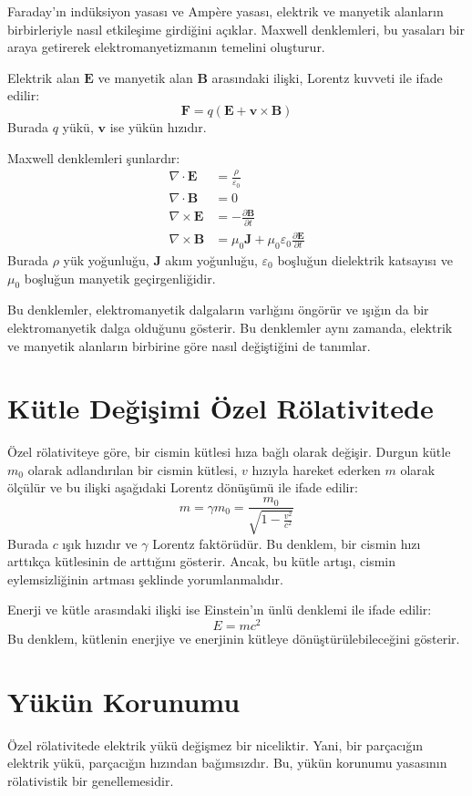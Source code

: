 \documentclass[11pt,letterpaper,twocolumn]{fenbil}
\begin{document}
Faraday'ın indüksiyon yasası ve Ampère yasası, elektrik ve manyetik alanların birbirleriyle nasıl etkileşime girdiğini açıklar. Maxwell denklemleri, bu yasaları bir araya getirerek elektromanyetizmanın temelini oluşturur.

Elektrik alan \( \mathbf{E} \) ve manyetik alan \( \mathbf{B} \) arasındaki ilişki, Lorentz kuvveti ile ifade edilir:
\[ \mathbf{F} = q(\mathbf{E} + \mathbf{v} \times \mathbf{B}) \]
Burada \( q \) yükü, \( \mathbf{v} \) ise yükün hızıdır.

Maxwell denklemleri şunlardır:
\begin{align*}
\nabla \cdot \mathbf{E} &= \frac{\rho}{\varepsilon_0} \\
\nabla \cdot \mathbf{B} &= 0 \\
\nabla \times \mathbf{E} &= -\frac{\partial \mathbf{B}}{\partial t} \\
\nabla \times \mathbf{B} &= \mu_0 \mathbf{J} + \mu_0 \varepsilon_0 \frac{\partial \mathbf{E}}{\partial t}
\end{align*}
Burada \( \rho \) yük yoğunluğu, \( \mathbf{J} \) akım yoğunluğu, \( \varepsilon_0 \) boşluğun dielektrik katsayısı ve \( \mu_0 \) boşluğun manyetik geçirgenliğidir.

Bu denklemler, elektromanyetik dalgaların varlığını öngörür ve ışığın da bir elektromanyetik dalga olduğunu gösterir. Bu denklemler aynı zamanda, elektrik ve manyetik alanların birbirine göre nasıl değiştiğini de tanımlar.

\section{Kütle Değişimi Özel Rölativitede}
Özel rölativiteye göre, bir cismin kütlesi hıza bağlı olarak değişir. Durgun kütle \( m_0 \) olarak adlandırılan bir cismin kütlesi, \( v \) hızıyla hareket ederken \( m \) olarak ölçülür ve bu ilişki aşağıdaki Lorentz dönüşümü ile ifade edilir:
\[ m = \gamma m_0 = \frac{m_0}{\sqrt{1 - \frac{v^2}{c^2}}} \]
Burada \( c \) ışık hızıdır ve \( \gamma \) Lorentz faktörüdür. Bu denklem, bir cismin hızı arttıkça kütlesinin de arttığını gösterir. Ancak, bu kütle artışı, cismin eylemsizliğinin artması şeklinde yorumlanmalıdır.

Enerji ve kütle arasındaki ilişki ise Einstein'ın ünlü denklemi ile ifade edilir:
\[ E = mc^2 \]
Bu denklem, kütlenin enerjiye ve enerjinin kütleye dönüştürülebileceğini gösterir.

\section{Yükün Korunumu}
Özel rölativitede elektrik yükü değişmez bir niceliktir. Yani, bir parçacığın elektrik yükü, parçacığın hızından bağımsızdır. Bu, yükün korunumu yasasının rölativistik bir genellemesidir.
\end{document}
